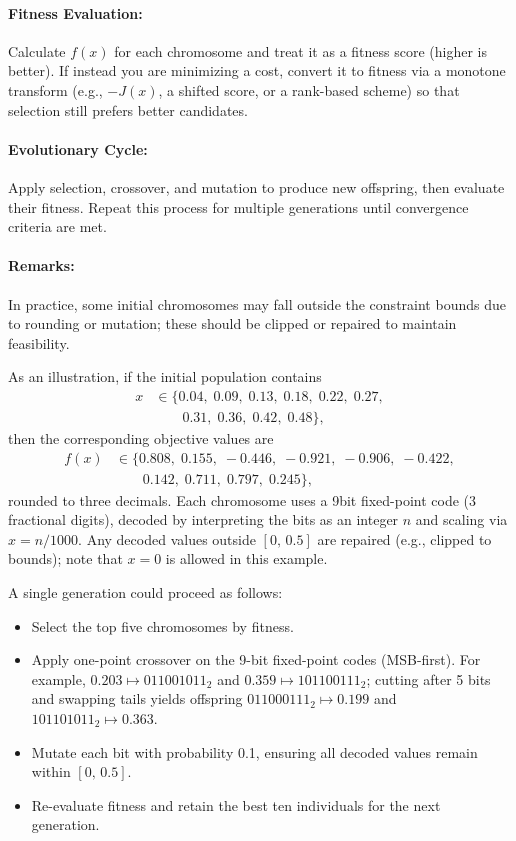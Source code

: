 \paragraph{Fitness Evaluation:}
Calculate \(f(x)\) for each chromosome and treat it as a fitness score (higher is better). If instead you are minimizing a cost, convert it to fitness via a monotone transform (e.g., \(-J(x)\), a shifted score, or a rank-based scheme) so that selection still prefers better candidates.

\paragraph{Evolutionary Cycle:}
Apply selection, crossover, and mutation to produce new offspring, then evaluate their fitness. Repeat this process for multiple generations until convergence criteria are met.

\paragraph{Remarks:}
In practice, some initial chromosomes may fall outside the constraint bounds due to rounding or mutation; these should be clipped or repaired to maintain feasibility.

As an illustration, if the initial population contains
\[
\begin{aligned}
x &\in \{0.04,\;0.09,\;0.13,\;0.18,\;0.22,\;0.27,\\
&\qquad 0.31,\;0.36,\;0.42,\;0.48\},
\end{aligned}
\]
then the corresponding objective values are
\[
\begin{aligned}
f(x) &\in \{0.808,\;0.155,\;-0.446,\;-0.921,\;-0.906,\;-0.422,\\
&\qquad 0.142,\;0.711,\;0.797,\;0.245\},
\end{aligned}
\]
rounded to three decimals.
Each chromosome uses a 9\text{-}bit fixed-point code (3 fractional digits), decoded by interpreting the bits as an integer \(n\) and scaling via \(x=n/1000\). Any decoded values outside \([0,\,0.5]\) are repaired (e.g., clipped to bounds); note that \(x=0\) is allowed in this example.

A single generation could proceed as follows:
\begin{itemize}
    \item Select the top five chromosomes by fitness.
    \item Apply one-point crossover on the 9-bit fixed-point codes (MSB-first). For example, \(0.203 \mapsto 011001011_2\) and \(0.359 \mapsto 101100111_2\); cutting after 5 bits and swapping tails yields offspring \(011000111_2 \mapsto 0.199\) and \(101101011_2 \mapsto 0.363\).
    \item Mutate each bit with probability 0.1, ensuring all decoded values remain within \([0,\,0.5]\).
    \item Re-evaluate fitness and retain the best ten individuals for the next generation.
\end{itemize}

